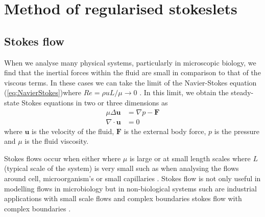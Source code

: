 \section{Method of regularised stokeslets}
\subsection{Stokes flow}
When we analyse many physical systems, particularly in microscopic biology, we find that the inertial forces within the fluid are small in comparison to that of the viscous terms. In these cases we can take the limit of the Navier-Stokes equation (\cref{eq:NavierStokes})where $R e=\rho u L/\mu \to 0 $ \cite{Trombley2019BasicFlows}. In this limit, we obtain the steady-state Stokes equations in two or three dimensions as 
\begin{subequations}
\label{eq:StokesFlow}
\begin{align}
    \mu\Delta\boldsymbol{u} &= \nabla p - \boldsymbol{F} \label{eq:StokesFlow1} \\
    \nabla \cdot \boldsymbol{u} &= 0 \label{eq:StokesFlow2}
\end{align}
\end{subequations}
where $\bm{u}$ is the velocity of the fluid, $\bm{F}$ is the external body force, $p$ is the pressure and $\mu$ is the fluid viscosity.

Stokes flows occur when either where $\mu$ is large or at small length scales where $L$ (typical scale of the system) is very small such as when analysing the flows around cell, microorganism's or small capillaries \cite{Blake1972AOrganisms, Higdon1979APropulsion, Smith2009MathematicalFluids}. Stokes flow is not only useful in modelling flows in microbiology but in non-biological systems such are industrial applications with small scale flows and complex boundaries stokes flow with complex boundaries \cite{Liron1978StokesPipe, Liron1976StokesPlates}.

